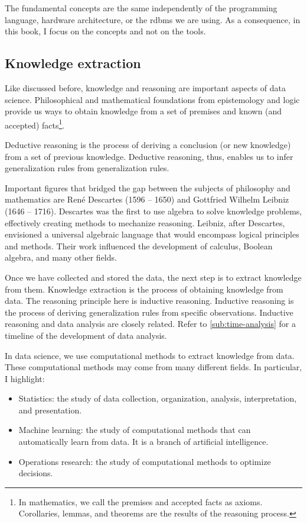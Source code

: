 The fundamental concepts are the same independently of the programming language, hardware
architecture, or the \gls{rdbms} we are using.  As a consequence, in this book, I focus on
the concepts and not on the tools.

\subsection{Knowledge extraction}
\label{sub:knowledge}

Like discussed before, knowledge and reasoning are important aspects of data science.
Philosophical and mathematical foundations from epistemology and logic provide us ways
to obtain knowledge from a set of premises and known (and accepted) facts\footnote{In
mathematics, we call the premises and accepted facts as axioms.  Corollaries,
lemmas, and theorems are the results of the reasoning process.}.

Deductive reasoning is the process of deriving a conclusion (or new knowledge) from
a set of previous knowledge.  Deductive reasoning, thus, enables us to infer
generalization rules from generalization rules.

Important figures that bridged the gap between the subjects of philosophy and mathematics are
René Descartes (1596 -- 1650) and Gottfried Wilhelm Leibniz (1646 -- 1716).  Descartes
was the first to use algebra to solve knowledge problems, effectively creating
methods to mechanize reasoning.  Leibniz, after Descartes, envisioned a universal
algebraic language that would encompass logical principles and methods. Their work
influenced the development of calculus, Boolean algebra, and many other fields.

Once we have collected and stored the data, the next step is to extract knowledge from them.
Knowledge extraction is the process of obtaining knowledge from data.  The reasoning
principle here is inductive reasoning.  Inductive reasoning is the process of deriving
generalization rules from specific observations.  Inductive reasoning and data analysis
are closely related.  Refer to \cref{sub:time-analysis} for a timeline of the development
of data analysis.

In data science, we use computational methods to extract knowledge from data.  These
computational methods may come from many different fields.  In particular, I highlight:
\begin{itemize}
  \itemsep0em
  \item Statistics: the study of data collection, organization, analysis, interpretation,
    and presentation.
  \item Machine learning: the study of computational methods that can automatically learn from data.
    It is a branch of artificial intelligence.
  \item Operations research: the study of computational methods to optimize decisions.
\end{itemize}


